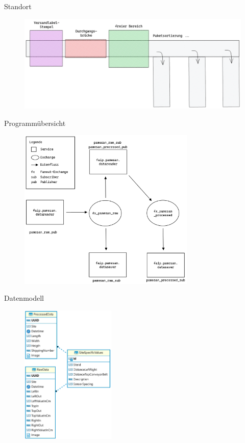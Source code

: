 \documentclass[10pt,ngerman]{beamer}
\begin{document}
\begin{frame}[fragile]{Standort}
  \begin{figure}[htpb]
    \centering
    \includegraphics[width=1\textwidth]{pics/Versandanlage.png}
  \end{figure}
\end{frame}


\begin{frame}[fragile]{Programmübersicht}
  \begin{figure}[htpb]
    \centering
    \includegraphics[width=0.75\textwidth]{pics/Architektur.png}
  \end{figure}
\end{frame}


\begin{frame}[fragile]{Datenmodell}
  \begin{figure}[htpb]
    \centering
    \includegraphics[width=0.4\textwidth]{pics/Tabellenmodell.png}
  \end{figure}
\end{frame}
\end{document}
